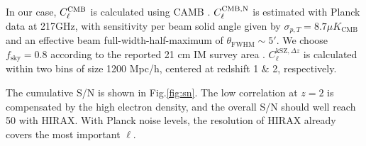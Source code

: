 In our case, $C_\ell^\mathrm{CMB}$ is calculated using CAMB \cite{CAMB}. $C_\ell^\mathrm{CMB,N}$ is estimated with Planck data \cite{Planck2015} at 217GHz, with sensitivity per beam solid angle given by $\sigma_{p,T}=8.7\mu K_\mathrm{CMB}$ and an effective beam full-width-half-maximum of $\theta_\mathrm{FWHM}\sim 5'$. 
We choose $f_\mathrm{sky}=0.8$ according to the reported 21 cm IM survey area . $C_\ell^{\mathrm{kSZ},\Delta z}$ is calculated within two bins of size 1200 Mpc/h, centered at redshift 1 $\&$ 2, respectively. 

The cumulative S/N  is shown in Fig.\ref{fig:sn}. The low correlation  at $z=2$ is compensated by the high electron density, and the overall S/N should well reach 50 with HIRAX. With Planck noise levels, the resolution of HIRAX already covers the most important $\ell$. 

